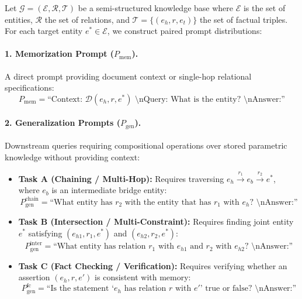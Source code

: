 \documentclass[11pt]{article}
\newcommand{\Pmem}{P_{\text{mem}}}
\newcommand{\Pgen}{P_{\text{gen}}}
\theoremstyle{definition}
\begin{document}
Let $\mathcal{G} = (\mathcal{E}, \mathcal{R}, \mathcal{T})$ be a semi-structured knowledge base where $\mathcal{E}$ is the set of entities, $\mathcal{R}$ the set of relations, and $\mathcal{T} = \{(e_h, r, e_t)\}$ the set of factual triples. For each target entity $e^* \in \mathcal{E}$, we construct paired prompt distributions:

\paragraph{1. Memorization Prompt ($\Pmem$).} 
A direct prompt providing document context or single-hop relational specifications:
\begin{equation}
  \Pmem = \text{``Context: } \mathcal{D}(e_h, r, e^*) \text{ \textbackslash nQuery: What is the entity? \textbackslash nAnswer:''}
\end{equation}

\paragraph{2. Generalization Prompts ($\Pgen$).} 
Downstream queries requiring compositional operations over stored parametric knowledge without providing context:
\begin{itemize}
    \item \textbf{Task A (Chaining / Multi-Hop):} Requires traversing $e_h \xrightarrow{r_1} e_b \xrightarrow{r_2} e^*$, where $e_b$ is an intermediate bridge entity:
    \begin{equation}
      \Pgen^{\text{chain}} = \text{``What entity has } r_2 \text{ with the entity that has } r_1 \text{ with } e_h\text{? \textbackslash nAnswer:''}
    \end{equation}
    \item \textbf{Task B (Intersection / Multi-Constraint):} Requires finding joint entity $e^*$ satisfying $(e_{h1}, r_1, e^*)$ and $(e_{h2}, r_2, e^*)$:
    \begin{equation}
      \Pgen^{\text{inter}} = \text{``What entity has relation } r_1 \text{ with } e_{h1} \text{ and } r_2 \text{ with } e_{h2}\text{? \textbackslash nAnswer:''}
    \end{equation}
    \item \textbf{Task C (Fact Checking / Verification):} Requires verifying whether an assertion $(e_h, r, e')$ is consistent with memory:
    \begin{equation}
      \Pgen^{\text{fc}} = \text{``Is the statement `} e_h \text{ has relation } r \text{ with } e'\text{' true or false? \textbackslash nAnswer:''}
    \end{equation}
\end{itemize}
\end{document}
